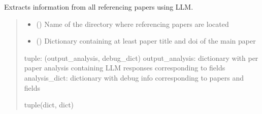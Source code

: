 \documentclass[letterpaper,10pt,english]{sphinxmanual}
\begin{document}

\begin{fulllineitems}
\label{\detokenize{reference_analysis:reference_analysis.analyze_references}}
\pysigstartsignatures
\pysiglinewithargsret
{}
{\sphinxparamcomma {}}
{}
\pysigstopsignatures
\sphinxAtStartPar
Extracts information from all referencing papers using LLM.
\begin{quote}\begin{description}
\begin{itemize}
\item {} 
\sphinxAtStartPar
{} () \textendash{} Name of the directory where referencing papers are located

\item {} 
\sphinxAtStartPar
{} () \textendash{} Dictionary containing at least paper title and doi of the main paper

\end{itemize}

\sphinxAtStartPar
tuple: (output\_analysis, debug\_dict)
output\_analysis: dictionary with per paper analysis containing LLM responses corresponding to fields
analysis\_dict: dictionary with debug info corresponding to papers and fields

\sphinxAtStartPar
tuple(dict, dict)

\end{description}\end{quote}

\end{fulllineitems}

\end{document}
